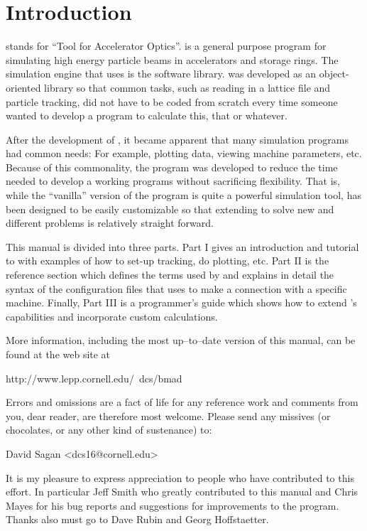 \section*{Introduction}

\tao stands for ``Tool for Accelerator Optics''. \tao is a general
purpose program for simulating high energy particle beams in
accelerators and storage rings. The simulation engine that \tao uses
is the \bmad software library\cite{b:bmad}. \bmad was developed as an
object-oriented library so that common tasks, such as reading in a
lattice file and particle tracking, did not have to be coded from
scratch every time someone wanted to develop a program to calculate
this, that or whatever.

After the development of \bmad, it became apparent that many simulation
programs had common needs: For example, plotting data, viewing machine
parameters, etc. Because of this commonality, the \tao program was
developed to reduce the time needed to develop a working programs
without sacrificing flexibility. That is, while the ``vanilla''
version of the \tao program is quite a powerful simulation tool, \tao
has been designed to be easily customizable so that extending \tao to
solve new and different problems is relatively straight forward.

This manual is divided into three parts. Part I gives an introduction
and tutorial to \tao with examples of how to set-up tracking, do
plotting, etc. Part II is the reference section which defines the
terms used by \tao and explains in detail the syntax of the
configuration files that \tao uses to make a connection with a
specific machine. Finally, Part III is a programmer's guide which
shows how to extend \tao's capabilities and incorporate custom
calculations.

More information, including the most up--to--date version of this
manual, can be found at the \bmad web site at
\begin{example}
  http://www.lepp.cornell.edu/~dcs/bmad
\end{example}

Errors and omissions are a fact of life for any reference work and
comments from you, dear reader, are therefore most welcome. Please
send any missives (or chocolates, or any other kind of sustenance) to:
\begin{example}
  David Sagan <dcs16@cornell.edu>
\end{example}

It is my pleasure to express appreciation to people who have
contributed to this effort. In particular Jeff Smith who greatly
contributed to this manual and Chris Mayes for his bug reports and
suggestions for improvements to the program. Thanks also must go to
Dave Rubin and Georg Hoffstaetter.
